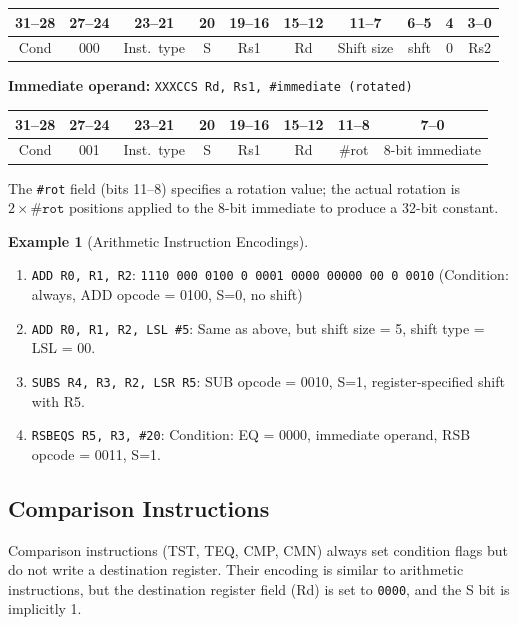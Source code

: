 \documentclass[11pt, a4paper, notitlepage]{report}
\theoremstyle{definition}
\theoremstyle{remark}
\theoremstyle{definition}
\newtheorem{example}[theorem]{Example}
\begin{document}
\begin{center}
\begin{tabular}{|c|c|c|c|c|c|c|c|c|c|}
\hline
31--28 & 27--24 & 23--21 & 20 & 19--16 & 15--12 & 11--7 & 6--5 & 4 & 3--0 \\
\hline
Cond & 000 & Inst.\ type & S & Rs1 & Rd & Shift size & shft & 0 & Rs2 \\
\hline
\end{tabular}
\end{center}

\textbf{Immediate operand:} \texttt{XXXCCS Rd, Rs1, \#immediate (rotated)}

\begin{center}
\begin{tabular}{|c|c|c|c|c|c|c|c|}
\hline
31--28 & 27--24 & 23--21 & 20 & 19--16 & 15--12 & 11--8 & 7--0 \\
\hline
Cond & 001 & Inst.\ type & S & Rs1 & Rd & \#rot & 8-bit immediate \\
\hline
\end{tabular}
\end{center}

The \texttt{\#rot} field (bits 11--8) specifies a rotation value; the actual rotation is $2 \times \texttt{\#rot}$ positions applied to the 8-bit immediate to produce a 32-bit constant.

\begin{example}[Arithmetic Instruction Encodings]
\leavevmode
\begin{enumerate}
  \item \texttt{ADD R0, R1, R2}: \texttt{1110 000 0100 0 0001 0000 00000 00 0 0010} (Condition: always, ADD opcode = 0100, S=0, no shift)
  \item \texttt{ADD R0, R1, R2, LSL \#5}: Same as above, but shift size = 5, shift type = LSL = 00.
  \item \texttt{SUBS R4, R3, R2, LSR R5}: SUB opcode = 0010, S=1, register-specified shift with R5.
  \item \texttt{RSBEQS R5, R3, \#20}: Condition: EQ = 0000, immediate operand, RSB opcode = 0011, S=1.
\end{enumerate}
\end{example}

\subsection{Comparison Instructions}

Comparison instructions (TST, TEQ, CMP, CMN) always set condition flags but do not write a destination register. Their encoding is similar to arithmetic instructions, but the destination register field (Rd) is set to \texttt{0000}, and the S bit is implicitly 1.
\end{document}
